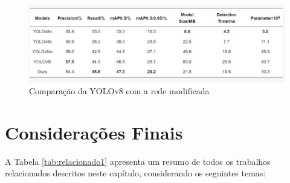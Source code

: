 \begin{figure}[!h]
    \center
    \begin{minipage}{0.9\linewidth}
        \center
        \captionsetup{justification=centering,margin=0.5cm,font=small}
        \includegraphics[width=0.7\linewidth]{img/cap3/chines-tabela.jpeg}
        \caption{Comparação da YOLOv8 com a rede modificada}
        \label{fig:chines-tabela}
    \end{minipage}
\end{figure}

\section{Considerações Finais}

A Tabela \ref{tab:relacionado1} apresenta um resumo de todos os trabalhos relacionados descritos neste capítulo, considerando os seguintes temas:

